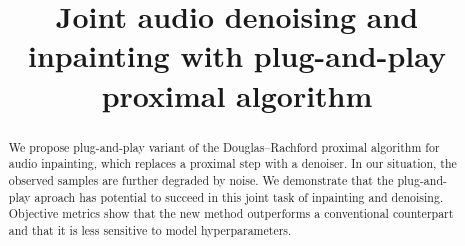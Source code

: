 \documentclass[conference]{IEEEtran}
\newcommand{\todo}[1]{\textcolor{red}{#1}}
\begin{document}

\title{Joint audio denoising and inpainting with plug-and-play proximal algorithm}

\author{
\and
{}
}

\maketitle

\begin{abstract}
We propose plug-and-play variant of the Douglas--Rachford proximal algorithm for audio inpainting, which replaces a proximal step with a denoiser.
In our situation, the observed samples are further degraded by noise.
We demonstrate that the plug-and-play aproach has potential to succeed in this joint task of inpainting and denoising.
Objective metrics show that the new method outperforms a conventional counterpart and that it is less sensitive to model hyperparameters.
\end{abstract}
\end{document}
